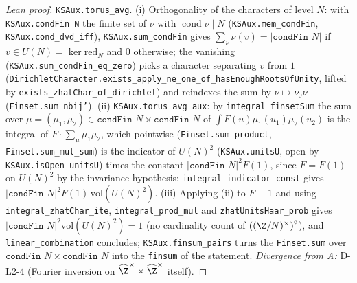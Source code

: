\begin{proof}[Lean proof]
\texttt{KSAux.torus\_avg}. (i) Orthogonality of the characters of level $N$: with \texttt{KSAux.condFin N} the finite set of $\nu$ with $\operatorname{cond}\nu\mid N$ (\texttt{KSAux.mem\_condFin}, \texttt{KSAux.cond\_dvd\_iff}), \texttt{KSAux.sum\_condFin} gives $\sum_{\nu}\nu(v)=|\texttt{condFin }N|$ if $v\in U(N)=\ker\mathrm{red}_N$ and $0$ otherwise; the vanishing (\texttt{KSAux.sum\_condFin\_eq\_zero}) picks a character separating $v$ from $1$ (\texttt{DirichletCharacter.exists\_apply\_ne\_one\_of\_hasEnoughRootsOfUnity}, lifted by \texttt{exists\_zhatChar\_of\_dirichlet}) and reindexes the sum by $\nu\mapsto\nu_0\nu$ (\texttt{Finset.sum\_nbij'}). (ii) \texttt{KSAux.torus\_avg\_aux}: by \texttt{integral\_finsetSum} the sum over $\mu=(\mu_1,\mu_2)\in\texttt{condFin }N\times\texttt{condFin }N$ of $\int F(u)\mu_1(u_1)\mu_2(u_2)$ is the integral of $F\cdot\sum_\mu\mu_1\mu_2$, which pointwise (\texttt{Finset.sum\_product}, \texttt{Finset.sum\_mul\_sum}) is the indicator of $U(N)^2$ (\texttt{KSAux.unitsU}, open by \texttt{KSAux.isOpen\_unitsU}) times the constant $|\texttt{condFin }N|^2F(1)$, since $F=F(1)$ on $U(N)^2$ by the invariance hypothesis; \texttt{integral\_indicator\_const} gives $|\texttt{condFin }N|^2F(1)\,\mathrm{vol}(U(N)^2)$. (iii) Applying (ii) to $F\equiv1$ and using \texttt{integral\_zhatChar\_ite}, \texttt{integral\_prod\_mul} and \texttt{zhatUnitsHaar\_prob} gives $|\texttt{condFin }N|^2\mathrm{vol}(U(N)^2)=1$ (no cardinality count of $((\Z/N)^\times)^2$), and \texttt{linear\_combination} concludes; \texttt{KSAux.finsum\_pairs} turns the \texttt{Finset.sum} over $\texttt{condFin }N\times\texttt{condFin }N$ into the \texttt{finsum} of the statement. \emph{Divergence from A:} D-L2-4 (Fourier inversion on $\widehat{\Z}^\times\times\widehat{\Z}^\times$ itself).
\end{proof}

